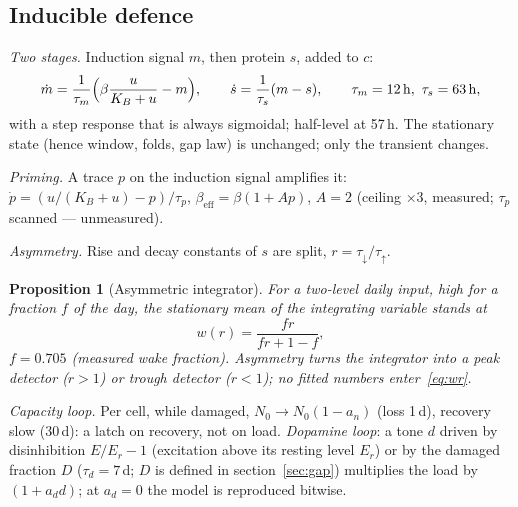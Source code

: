 \documentclass[11pt,a4paper]{article}
\newtheorem{proposition}{Proposition}[section]
\theoremstyle{remark}
\begin{document}
\subsection{Inducible defence}\label{sec:defence}
\emph{Two stages.} Induction signal $m$, then protein $s$, added to $c$:
\begin{equation}\label{eq:twostage}
\dot m=\frac{1}{\tau_m}\Bigl(\beta\frac{u}{K_B+u}-m\Bigr),\qquad
\dot s=\frac{1}{\tau_s}(m-s),\qquad
\tau_m=12\,\mathrm{h},\ \tau_s=63\,\mathrm{h},
\end{equation}
with a step response that is always sigmoidal; half-level at 57\,h. The stationary
state (hence window, folds, gap law) is unchanged; only the transient changes.

\emph{Priming.} A trace $p$ on the induction signal amplifies it:
$\dot p=(u/(K_B+u)-p)/\tau_p$, $\beta_{\mathrm{eff}}=\beta(1+Ap)$, $A=2$ (ceiling
$\times3$, measured; $\tau_p$ scanned --- unmeasured).

\emph{Asymmetry.} Rise and decay constants of $s$ are split, $r=\tau_{\downarrow}/\tau_{\uparrow}$.

\begin{proposition}[Asymmetric integrator]\label{prop:wr}
For a two-level daily input, high for a fraction $f$ of the day, the stationary mean of
the integrating variable stands at
\begin{equation}\label{eq:wr}
w(r)=\frac{fr}{fr+1-f},
\end{equation}
$f=0.705$ (measured wake fraction). Asymmetry turns the integrator into a peak detector
($r>1$) or trough detector ($r<1$); no fitted numbers enter~\eqref{eq:wr}.
\end{proposition}

\emph{Capacity loop.} Per cell, while damaged, $N_0\to N_0(1-a_n)$ (loss 1\,d), recovery
slow (30\,d): a latch on recovery, not on load. \emph{Dopamine loop}: a tone $d$
driven by disinhibition $E/E_r-1$ (excitation above its resting level $E_r$) or by the
damaged fraction $D$ ($\tau_d=7$\,d; $D$ is defined in section~\ref{sec:gap}) multiplies
the load by
$(1+a_d d)$; at $a_d=0$ the model is reproduced bitwise.
\end{document}
